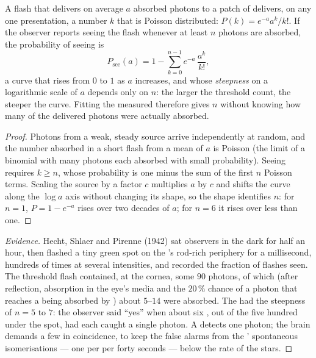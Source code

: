 \begin{theorem}\label{thm:b3:sensory-systems:hecht}
A flash that delivers on average $a$ absorbed photons to a patch of
 delivers, on any one presentation, a number $k$ that is Poisson
distributed: $P(k) = e^{-a}a^{k}/k!$. If the observer reports seeing
the flash whenever at least $n$ photons are absorbed, the probability
of seeing is
\[
P_{\text{see}}(a) = 1 - \sum_{k=0}^{n-1} e^{-a}\,\frac{a^{k}}{k!} ,
\]
a curve that rises from $0$ to $1$ as $a$ increases, and whose
\emph{steepness} on a logarithmic scale of $a$ depends only on $n$:
the larger the threshold count, the steeper the curve. Fitting
the measured  therefore gives $n$ without
knowing how many of the delivered photons were actually absorbed.
\end{theorem}
\begin{proof}
Photons from a weak, steady source arrive independently at random, and
the number absorbed in a short flash from a mean of $a$ is Poisson
(the limit of a binomial with many photons each absorbed with small
probability). Seeing requires $k \ge n$, whose probability is one
minus the sum of the first $n$ Poisson terms. Scaling the source by a
factor $c$ multiplies $a$ by $c$ and shifts the curve along the $\log a$
axis without changing its shape, so the shape identifies $n$: for $n =
1$, $P = 1 - e^{-a}$ rises over two decades of $a$; for $n = 6$ it
rises over less than one.
\end{proof}

\begin{proof}[Evidence]
Hecht, Shlaer and Pirenne (1942) sat observers in the dark for half
an hour, then flashed a tiny green spot on the 's rod-rich
periphery for a millisecond, hundreds of times at several intensities,
and recorded the fraction of flashes seen. The threshold flash
contained, at the cornea, some $90$ photons, of which (after
reflection, absorption in the eye's media and the $20\,\%$ chance of a
photon that reaches a  being absorbed by ) about $5$--$14$
were absorbed. The  had the steepness of
$n = 5$ to $7$: the observer said ``yes'' when about six , out of
the five hundred under the spot, had each caught a single photon. A
 detects one photon; the brain demands a few in coincidence, to
keep the false alarms from the ' spontaneous isomerisations ---
one per  per forty seconds --- below the rate of the stars.
\end{proof}


